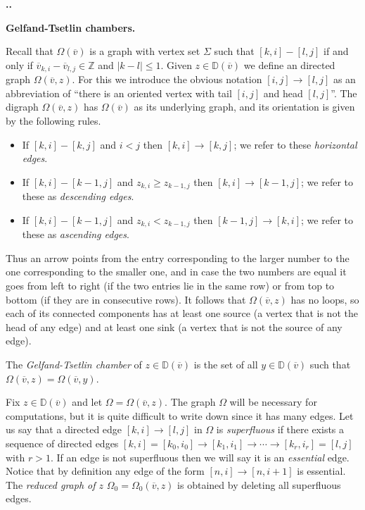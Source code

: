 \documentclass[11pt,fleqn]{amsart}
\renewcommand\thesection{\arabic{section}}
\newcounter{para}[section]
\renewcommand\thepara{\thesection.\arabic{para}}
\def\paragraph{%
 \noindent
 \refstepcounter{para}%
 \textbf{\thepara.}\hspace{1ex}%
}
\newcommand\about[1]{%
 {\bfseries#1.}%
}
\newcommand\ZZ{\mathbb Z}
\newcommand\vv{\overline{v}}
\newcommand\DD{\mathbb D}
\begin{document}
\paragraph
\about{Gelfand-Tsetlin chambers}
\label{gt-chambers}
Recall that $\Omega(\vv)$ is a graph with vertex set $\Sigma$ such that
$[k,i] - [l,j]$ if and only if $\vv_{k,i} - \vv_{l,j} \in \ZZ$ and $|k-l| 
\leq 1$. Given $z \in \DD(\vv)$ we define an directed graph $\Omega(\vv,z)$. 
For this we introduce the obvious notation $[i,j] \rightarrow [l,j]$ as an
abbreviation of ``there is an oriented vertex with tail $[i,j]$ and head
$[l,j]$''. The digraph $\Omega(\vv,z)$ has $\Omega(\vv)$ as its underlying
graph, and its orientation is given by the following rules.
\begin{itemize}
\item If $[k,i] - [k,j]$ and $i < j$ then $[k,i] \rightarrow [k,j]$; we refer
to these \emph{horizontal edges}.

\item If $[k,i] - [k-1,j]$ and $z_{k,i} \geq z_{k-1,j}$ then  $[k,i] 
\rightarrow [k-1,j]$; we refer to these as \emph{descending edges}.

\item If $[k,i] - [k-1,j]$ and $z_{k,i} < z_{k-1,j}$ then  $[k-1,j] 
\rightarrow [k,i]$; we refer to these as \emph{ascending edges}.
\end{itemize}
Thus an arrow points from the entry corresponding to the larger number to the 
one corresponding to the smaller one, and in case the two numbers are equal it 
goes from left to right (if the two entries lie in the same row) or from top 
to bottom (if they are in consecutive rows). It follows that $\Omega(\vv,z)$ 
has no loops, so each of its connected components has at least one source (a 
vertex that is not the head of any edge) and at least one sink (a vertex that
is not the source of any edge).
\begin{Definition}
\label{D:gt-chamber}
The \emph{Gelfand-Tsetlin chamber} of $z \in \DD(\vv)$ is the set of all 
$y \in \DD(\vv)$ such that $\Omega(\vv,z) = \Omega(\vv,y)$. 
\end{Definition}
Fix $z \in \DD(\vv)$ and let $\Omega = \Omega(\vv,z)$. The graph $\Omega$ will
be necessary for computations, but it is quite difficult to write down since it
has many edges. Let us say that a directed edge $[k,i] \rightarrow [l,j]$ in 
$\Omega$ is \emph{superfluous} if there exists a sequence of directed edges 
$[k,i] = [k_0, i_0] \rightarrow [k_1, i_1]\rightarrow \cdots \rightarrow 
[k_r, i_r] = [l,j]$ with $r > 1$. If an edge is not superfluous then we will 
say it is an \emph{essential} edge. Notice that by definition any edge of the 
form $[n,i] \rightarrow [n,i+1]$ is essential. The \emph{reduced graph of $z$} 
$\Omega_0 = \Omega_0(\vv,z)$ is obtained by deleting all superfluous edges. 
\end{document}

